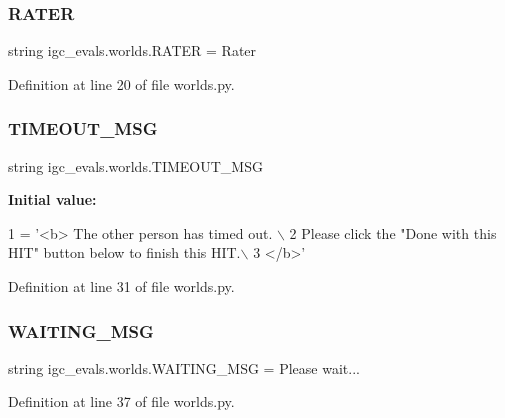 \subsubsection{\texorpdfstring{R\+A\+T\+ER}{RATER}}
{\footnotesize\ttfamily string igc\+\_\+evals.\+worlds.\+R\+A\+T\+ER = \textquotesingle{}Rater\textquotesingle{}}



Definition at line 20 of file worlds.\+py.

\mbox{\label{namespaceigc__evals_1_1worlds_ac83aec39d32ea66b10e3e623bc3a7d19}} 
\subsubsection{\texorpdfstring{T\+I\+M\+E\+O\+U\+T\+\_\+\+M\+SG}{TIMEOUT\_MSG}}
{\footnotesize\ttfamily string igc\+\_\+evals.\+worlds.\+T\+I\+M\+E\+O\+U\+T\+\_\+\+M\+SG}

{\bfseries Initial value\+:}
\begin{DoxyCode}
1 =  \textcolor{stringliteral}{'<b> The other person has timed out. \(\backslash\)}
2 \textcolor{stringliteral}{        Please click the "Done with this HIT" button below to finish this HIT.\(\backslash\)}
3 \textcolor{stringliteral}{        </b>'}
\end{DoxyCode}


Definition at line 31 of file worlds.\+py.

\mbox{\label{namespaceigc__evals_1_1worlds_a76b4576e14898ef76af46c094e4d9a30}} 
\subsubsection{\texorpdfstring{W\+A\+I\+T\+I\+N\+G\+\_\+\+M\+SG}{WAITING\_MSG}}
{\footnotesize\ttfamily string igc\+\_\+evals.\+worlds.\+W\+A\+I\+T\+I\+N\+G\+\_\+\+M\+SG = \textquotesingle{}Please wait...\textquotesingle{}}



Definition at line 37 of file worlds.\+py.

